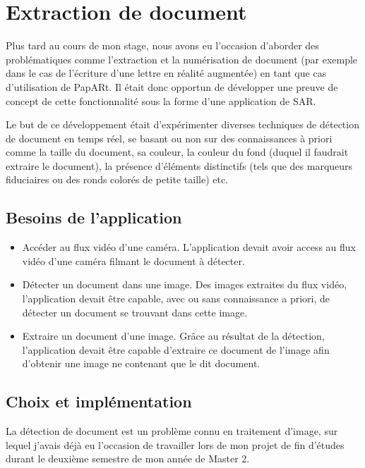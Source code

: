 \newpage
\section{Extraction de document}
\label{sec:document}
Plus tard au cours de mon stage, nous avons eu l'occasion d'aborder des problématiques comme l'extraction et la numérisation de document (par exemple dans le cas de l'écriture d'une lettre en réalité augmentée) en tant que cas d'utilisation de PapARt. Il était donc opportun de développer une preuve de concept de cette fonctionnalité sous la forme d'une application de SAR.

Le but de ce développement était d'expérimenter diverses techniques de détection de document en temps réel, se basant ou non sur des connaissances à priori comme la taille du document, sa couleur, la couleur du fond (duquel il faudrait extraire le document), la présence d'éléments distinctifs (tels que des marqueurs fiduciaires ou des ronds colorés de petite taille) etc.

\subsection{Besoins de l'application}
\label{subsec:doc:content}
\begin{itemize}
\item Accéder au flux vidéo d'une caméra. L'application devait avoir access au flux vidéo d'une caméra filmant le document à détecter.
\item Détecter un document dans une image. Des images extraites du flux vidéo, l'application devait être capable, avec ou sans connaissance a priori, de détecter un document se trouvant dans cette image.
\item Extraire un document d'une image. Grâce au résultat de la détection, l'application devait être capable d'extraire ce document de l'image afin d'obtenir une image ne contenant que le dit document.
\end{itemize}

\subsection{Choix et implémentation}
\label{subsec:doc:impl}

La détection de document est un problème connu en traitement d'image, sur lequel j'avais déjà eu l'occasion de travailler lors de mon projet de fin d'études durant le deuxième semestre de mon année de Master 2.

